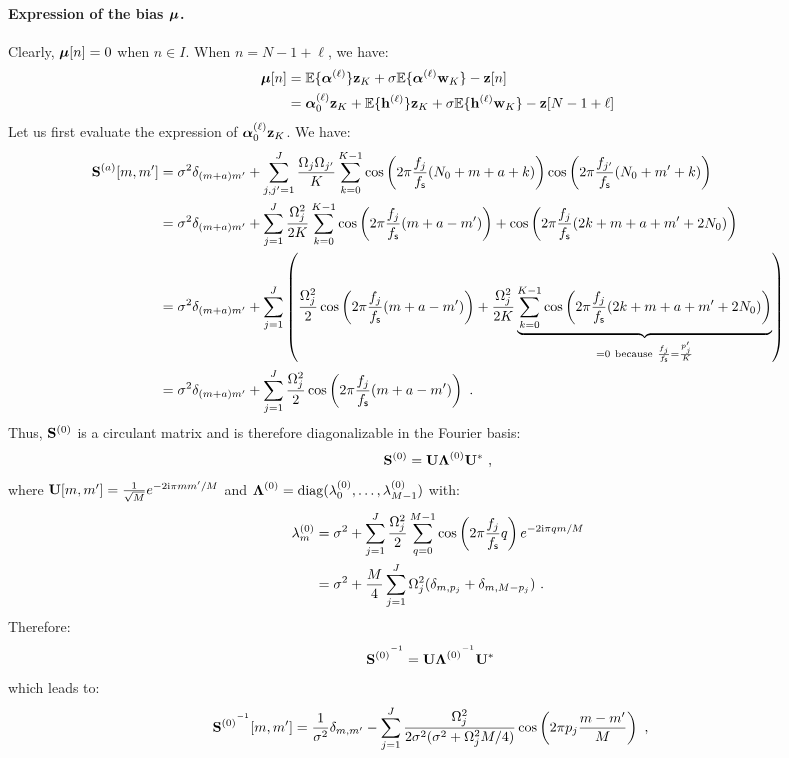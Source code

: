 \documentclass[journal, onecolumn]{IEEEtran}
\begin{document}
\paragraph{Expression of the bias $\boldsymbol{\mu}$.}
Clearly, $\boldsymbol{\mu}[n]=0$ when $n\in I$. When $n=N-1+\ell$, we have:
\begin{align*}
\boldsymbol{\mu}[n] &=  {\mathbb E}\{\boldsymbol{\alpha}^{(\ell)}\}{\mathbf z}_{K} + \sigma{\mathbb E}\{\boldsymbol{\alpha}^{(\ell)}{\mathbf w}_{K}\} - {\mathbf z}[n]\\
& = \boldsymbol{\alpha}_0^{(\ell)}{\mathbf z}_{K} + {\mathbb E}\{{\mathbf h}^{(\ell)}\}{\mathbf z}_{K} + \sigma{\mathbb E}\{{\mathbf h}^{(\ell)}{\mathbf w}_{K}\} - {\mathbf z}[N-1+\ell]
\end{align*}
Let us first evaluate the expression of $\boldsymbol{\alpha}_0^{(\ell)}{\mathbf z}_K$. We have:
\begin{align*}
\bS^{(a)}[m,m'] &= \sigma^2\delta_{(m+a)m'}+\sum_{j,j'=1}^J\dfrac{\Omega_j\Omega_{j'}}{K}\sum_{k=0}^{K-1} \cos\left(2\pi \frac{f_j}{\fs}(N_0+m+a+k)\right)\cos\left(2\pi \frac{f_{j'}}{\fs}(N_0+m'+k)\right) \\
&= \sigma^2\delta_{(m+a)m'}+\sum_{j=1}^J\dfrac{\Omega_j^2}{2K}\sum_{k=0}^{K-1} \cos\left(2\pi \frac{f_j}{\fs}(m+a-m')\right) + \cos\left(2\pi \frac{f_j}{\fs}(2k+m+a+m'+2N_0)\right)\\
&= \sigma^2\delta_{(m+a)m'}+\sum_{j=1}^J\left( \dfrac{\Omega_j^2}2\cos\left(2\pi \frac{f_j}{\fs}(m+a-m')\right) + \dfrac{\Omega_j^2}{2K}\underbrace{\sum_{k=0}^{K-1}\cos\left(2\pi \frac{f_j}{\fs}(2k+m+a+m'+2N_0)\right)}_{=0\ \mathrm{because}\ \frac{f_j}\fs=\frac{p'_j}K } \right)\\
&= \sigma^2\delta_{(m+a)m'}+\sum_{j=1}^J\dfrac{\Omega_j^2}2\cos\left(2\pi \frac{f_j}{\fs}(m+a-m')\right)\ .
\end{align*}
Thus, ${\mathbf S}^{(0)}$ is a circulant matrix and is therefore diagonalizable in the Fourier basis:
\[
{\mathbf S}^{(0)} = {\mathbf U}\boldsymbol{\Lambda}^{(0)}{\mathbf U}^*\ ,
\]
where ${\mathbf U}[m,m']=\frac1{\sqrt{M}}e^{-2\mathrm{i}\pi mm'/M}$ and $\boldsymbol{\Lambda}^{(0)} = \mathrm{diag}(\lambda_0^{(0)},\dots,\lambda_{M-1}^{(0)})$ with:
\begin{align*}
\lambda_m^{(0)} &= \sigma^2 + \sum_{j=1}^J\dfrac{\Omega_j^2}2\sum_{q=0}^{M-1} \cos\left(2\pi\frac{f_j}{f_{\mathsf s}} q\right) e^{-2\mathrm{i}\pi qm/M} \\
&= \sigma^2 + \dfrac{M}{4}\sum_{j=1}^J\Omega_j^2(\delta_{m,p_j} + \delta_{m,M-p_j})\ .
\end{align*}
Therefore:
\begin{align*}
{{\mathbf S}^{(0)}}^{^{-1}}  &= {\mathbf U}{\boldsymbol{\Lambda}^{(0)}}^{^{-1}}{\mathbf U}^*
\end{align*}
which leads to:
\begin{align*}
{{\mathbf S}^{(0)}}^{^{-1}}[m,m']  &= \dfrac1{\sigma^2}\delta_{m,m'}-\sum_{j=1}^J\dfrac{\Omega_j^2}{2\sigma^2(\sigma^2+\Omega_j^2M/4)}\cos\left(2\pi p_j \dfrac{m-m'}{M}\right)\ ,
\end{align*}
\end{document}
